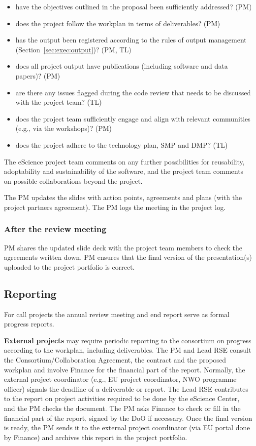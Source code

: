\begin{itemize}
\item have the objectives outlined in the proposal been sufficiently addressed? (PM)
\item does the project follow the workplan in terms of deliverables? (PM)
\item has the output been registered according to the rules of output management (Section~\ref{sec:exec:output})? (PM, TL)
\item does all project output have publications (including software and data papers)? (PM)
\item are there any issues flagged during the code review that needs to be discussed with the project team? (TL)
\item does the project team sufficiently engage and align with relevant communities (e.g., via the workshops)? (PM)
\item does the project adhere to the technology plan, SMP and DMP? (TL)
\end{itemize}

The eScience project team comments on any further possibilities for reusability, adoptability and sustainability of the
software, and the project team comments on possible collaborations beyond the project.

The PM updates the slides with action points, agreements and plans (with the project partners agreement). The PM logs
the meeting in the project log.

\subsubsection{After the review meeting}
PM shares the updated slide deck with the project team members to check the agreements written down. PM ensures that the
final version of the presentation(s) uploaded to the project portfolio is correct.

\subsection{Reporting}
For call projects the annual review meeting and end report serve as formal progress reports.

\textbf{External projects} may require periodic reporting to the consortium on progress according to the workplan,
including deliverables. The PM and Lead RSE consult the Consortium/Collaboration Agreement, the contract and the
proposed workplan and involve Finance for the financial part of the report. Normally, the external project coordinator
(e.g., EU project coordinator, NWO programme officer) signals the deadline of a deliverable or report. The Lead RSE
contributes to the report on project activities required to be done by the eScience Center, and the PM checks the
document. The PM asks Finance to check or fill in the financial part of the report, signed by the DoO if necessary. Once
the final version is ready, the PM sends it to the external project coordinator (via EU portal done by Finance) and
archives this report in the project portfolio.


